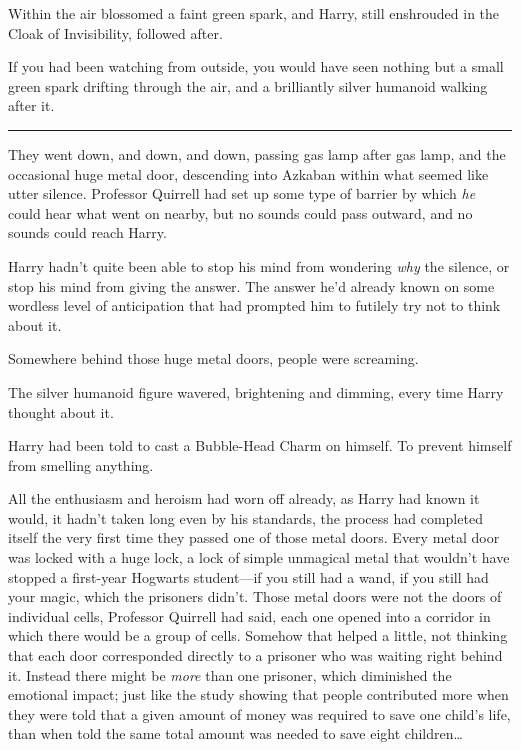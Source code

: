 Within the air blossomed a faint green spark, and Harry, still
enshrouded in the Cloak of Invisibility, followed after.

If you had been watching from outside, you would have seen nothing but a
small green spark drifting through the air, and a brilliantly silver
humanoid walking after it.

\begin{center}\rule{3in}{0.4pt}\end{center}

They went down, and down, and down, passing gas lamp after gas lamp, and
the occasional huge metal door, descending into Azkaban within what
seemed like utter silence. Professor Quirrell had set up some type of
barrier by which \emph{he} could hear what went on nearby, but no sounds
could pass outward, and no sounds could reach Harry.

Harry hadn't quite been able to stop his mind from wondering \emph{why}
the silence, or stop his mind from giving the answer. The answer he'd
already known on some wordless level of anticipation that had prompted
him to futilely try not to think about it.

Somewhere behind those huge metal doors, people were screaming.

The silver humanoid figure wavered, brightening and dimming, every time
Harry thought about it.

Harry had been told to cast a Bubble-Head Charm on himself. To prevent
himself from smelling anything.

All the enthusiasm and heroism had worn off already, as Harry had known
it would, it hadn't taken long even by his standards, the process had
completed itself the very first time they passed one of those metal
doors. Every metal door was locked with a huge lock, a lock of simple
unmagical metal that wouldn't have stopped a first-year Hogwarts
student---if you still had a wand, if you still had your magic, which
the prisoners didn't. Those metal doors were not the doors of individual
cells, Professor Quirrell had said, each one opened into a corridor in
which there would be a group of cells. Somehow that helped a little, not
thinking that each door corresponded directly to a prisoner who was
waiting right behind it. Instead there might be \emph{more} than one
prisoner, which diminished the emotional impact; just like the study
showing that people contributed more when they were told that a given
amount of money was required to save one child's life, than when told
the same total amount was needed to save eight children\ldots{}

